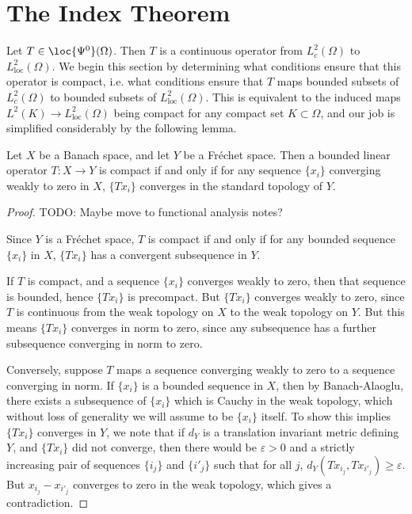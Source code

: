 \section{The Index Theorem}

Let $T \in \loc{\Psi^0}(\Omega)$. Then $T$ is a continuous operator from $L^2_c(\Omega)$ to $L^2_{\text{loc}}(\Omega)$. We begin this section by determining what conditions ensure that this operator is compact, i.e. what conditions ensure that $T$ maps bounded subsets of $L^2_c(\Omega)$ to bounded subsets of $L^2_{\text{loc}}(\Omega)$. This is equivalent to the induced maps $L^2(K) \to L^2_{\text{loc}}(\Omega)$ being compact for any compact set $K \subset \Omega$, and our job is simplified considerably by the following lemma.

\begin{lemma}
    Let $X$ be a Banach space, and let $Y$ be a Fr\'{e}chet space. Then a bounded linear operator $T: X \to Y$ is compact if and only if for any sequence $\{ x_i \}$ converging weakly to zero in $X$, $\{ Tx_i \}$ converges in the standard topology of $Y$.
\end{lemma}
\begin{proof}
    TODO: Maybe move to functional analysis notes?

    Since $Y$ is a Fr\'{e}chet space, $T$ is compact if and only if for any bounded sequence $\{ x_i \}$ in $X$, $\{ Tx_i \}$ has a convergent subsequence in $Y$.

    If $T$ is compact, and a sequence $\{ x_i \}$ converges weakly to zero, then that sequence is bounded, hence $\{ Tx_i \}$ is precompact. But $\{ Tx_i \}$ converges weakly to zero, since $T$ is continuous from the weak topology on $X$ to the weak topology on $Y$. But this means $\{ Tx_i \}$ converges in norm to zero, since any subsequence has a further subsequence converging in norm to zero.

    Conversely, suppose $T$ maps a sequence converging weakly to zero to a sequence converging in norm. If $\{ x_i \}$ is a bounded sequence in $X$, then by Banach-Alaoglu, there exists a subsequence of $\{ x_i \}$ which is Cauchy in the weak topology, which without loss of generality we will assume to be $\{ x_i \}$ itself. To show this implies $\{ Tx_i \}$ converges in $Y$, we note that if $d_Y$ is a translation invariant metric defining $Y$, and $\{ Tx_i \}$ did not converge, then there would be $\varepsilon > 0$ and a strictly increasing pair of sequences $\{ i_j \}$ and $\{ i'_j \}$ such that for all $j$, $d_Y(Tx_{i_j}, Tx_{i'_j}) \geq \varepsilon$. But $x_{i_j} - x_{i'_j}$ converges to zero in the weak topology, which gives a contradiction.
\end{proof}

